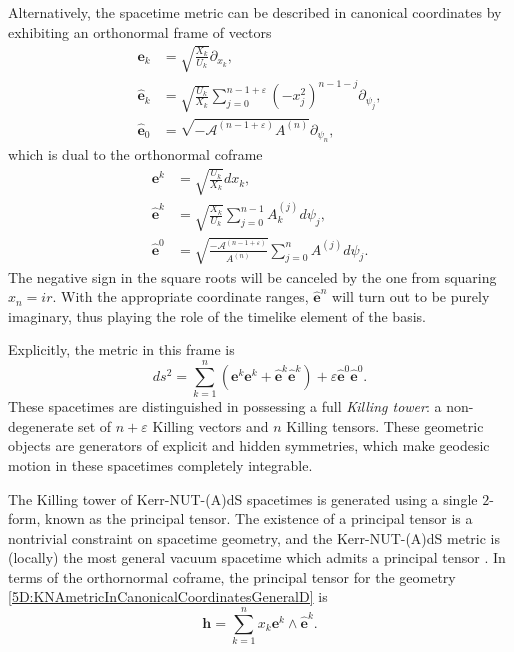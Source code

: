 Alternatively, the spacetime metric can be described in canonical coordinates by
exhibiting an orthonormal frame of vectors
%
\begin{equation} \label{5D:DarbouxFrame} 
    \begin{split}
        \mathbf{e}_{k} &= \sqrt{ \frac{X_{k}}{U_{k}}} \partial_{x_{k}}, \\
        \mathbf{\hat{e}}_{k} &= \sqrt{ \frac{U_{k}}{X_{k}}} \sum_{j = 0}^{n - 1 +
        \varepsilon} (-x_{j}^{2})^{n - 1 - j} \partial_{\psi_{j}}, \\
            \mathbf{\hat{e}}_{0} &= \sqrt{- \mathcal{A}^{(n - 1 + \varepsilon)} A^{(n)}} \partial_{\psi_{n}},
    \end{split}
\end{equation}
%
which is dual to the orthonormal coframe
%
\begin{equation} \label{5D:DarbouxCoFrame} 
    \begin{split}
        \mathbf{e}^{k} &= \sqrt{ \frac{U_{k}}{X_{k}}} dx_{k}, \\
        \mathbf{\hat{e}}^{k} &= \sqrt{ \frac{X_{k}}{U_{k}}} \sum_{j = 0}^{n - 1}
        A_{k}^{(j)} d\psi_{j}, \\
        \mathbf{\hat{e}}^{0} &= \sqrt{ \frac{- \mathcal{A}^{(n - 1 + \varepsilon)}}{A^{(n)}}} \sum_{j = 0}^{n} A^{(j)} d\psi_{j}.
    \end{split}
\end{equation}
%
The negative sign in the square roots will be canceled by the one from squaring $x_{n} = i r$. With the
appropriate coordinate ranges, $\mathbf{\hat{e}}^{n}$ will turn out to be purely imaginary, thus
playing the role of the timelike element of the basis.

Explicitly, the metric in this frame is
\begin{equation} \label{5D:MetricInDarbouxCoFrame} 
    ds^{2} = \sum_{k = 1}^{n} \left( \mathbf{e}^{k} \mathbf{e}^{k} + \mathbf{\hat{e}}^{k}
    \mathbf{\hat{e}}^{k}\right) + \varepsilon \mathbf{\hat{e}}^{0} \mathbf{\hat{e}}^{0}.
\end{equation}
%
These spacetimes are distinguished in possessing a full \emph{Killing tower}: a non-degenerate set of $n +
\varepsilon$ Killing vectors and $n$ Killing tensors. These geometric objects are generators of explicit and
hidden symmetries, which make geodesic motion in these spacetimes completely integrable.

The Killing tower of Kerr-NUT-(A)dS spacetimes is generated using a single $2$-form, known as the principal
tensor. The existence of a principal tensor is a nontrivial constraint on spacetime geometry, and the
Kerr-NUT-(A)dS metric is (locally) the most general vacuum spacetime which admits a principal tensor
\cite{Houri:2007xz, Frolov:2017kze}. %
In terms of the orthornormal coframe, the principal tensor for the geometry
\eqref{5D:KNAmetricInCanonicalCoordinatesGeneralD} is
%
\begin{equation} \label{5D:PrincipalTensorInDarbouxCoFrame} 
    \mathbf{h} = \sum_{k = 1}^{n} x_{k} \mathbf{e}^{k} \wedge \mathbf{\hat{e}}^{k}.
\end{equation}

